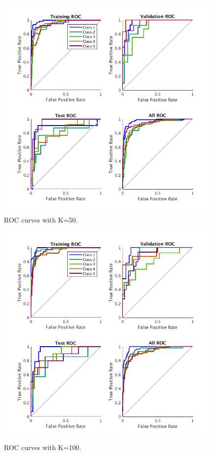 \documentclass{article}
\begin{document}
\begin{figure}[h]
\centering
\includegraphics[scale=0.5]{Figures/Metrics/roc_k50}
\caption{ROC curves with K=50.}
\label{fig:r50}
\end{figure}
\begin{figure}[h]
\centering
\includegraphics[scale=0.5]{Figures/Metrics/roc_k100}
\caption{ROC curves with K=100.}
\label{fig:r100}
\end{figure}
%
\end{document}
